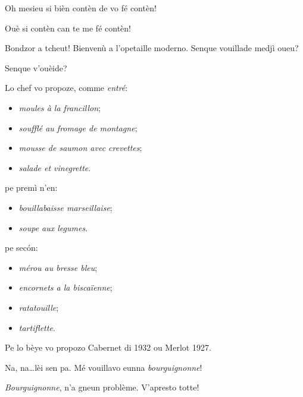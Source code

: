 \begin{drama}
\Eunfeurmispeaks Oh mesieu si bièn contèn de vo fé contèn!

\PersEmpourtantaspeaks Ouè si contèn can te me fé contèn!


\Tsambrispeaks Bondzor a tcheut! Bienvenù a l’opetaille moderno. Sen\-que vouillade medjì oueu?

\PersEmpourtantaspeaks Senque v'ouèide?

\Tsambrispeaks {} Lo chef vo propoze, comme \textit{entré}:

\begin{itemize}
\item[--]  \textit{moules à la francillon};
\item[--]  \textit{soufflé au fromage de montagne};
\item[--]  \textit{mousse de saumon avec crevettes};
\item[--]  \textit{salade et vinegrette}.
\end{itemize}

pe premì n’en:

\begin{itemize}
\item[--]  \textit{bouillabaisse marseillaise};
\item[--]  \textit{soupe aux legumes}.
\end{itemize}

pe sec\'on:

\begin{itemize}
\item[--] \textit{mérou au bresse bleu};
\item[--]  \textit{encornets a la biscaïenne};
\item[--]  \textit{ratatouille};
\item[--]  \textit{tartiflette}.
\end{itemize}

Pe lo bèye vo propozo Cabernet di 1932 ou Merlot 1927.


\PersEmpourtantaspeaks Na, na\ldots lèi sen pa. Mé vouillavo eunna \textit{bourguignonne}!

\Tsambrispeaks \textit{Bourguignonne}, n'a gneun problème. V'apresto tot\-te!



\end{drama}
